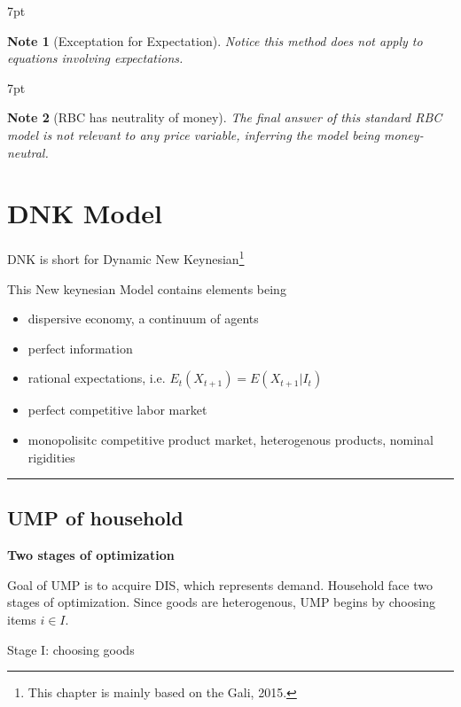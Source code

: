 \documentclass{article}
\providecommand{\tightlist}{
  \setlength{\itemsep}{0pt}
  \setlength{\parskip}{0pt}}
\newcommand*\sepline{%
  \begin{center}
    \rule[1ex]{.5\textwidth}{.5pt}
  \end{center}}
\newenvironment{blueblock}{
\def\FrameCommand{
  \hspace{1pt}
    {\color{DarkBlue}
    \vrule width 2pt}
    {\color{blueshade}
    \vrule width 4pt}
  \colorbox{blueshade}
}
\MakeFramed{
  \advance
  \hsize-
  \width
  \FrameRestore}
\noindent\hspace{-4.55pt}%
\begin{adjustwidth}{}{7pt}
\vspace{2pt}\vspace{2pt}
}
{\vspace{2pt}\end{adjustwidth}\endMakeFramed}
\newtheorem{note}{Note}
\begin{document}
\begin{blueblock}
\begin{note}[Exceptation for Expectation]
Notice this method does not apply to equations involving expectations.
\end{note}
\end{blueblock}

\begin{blueblock}
\begin{note}[RBC has neutrality of money]
The final answer of this standard RBC model is not relevant to any price variable, inferring the model being money-neutral.
\end{note}
\end{blueblock}









\newpage
\section{DNK Model}\label{dnk-model}

DNK is short for Dynamic New Keynesian\footnote{This chapter is mainly based on the Gali, 2015.}

This New keynesian Model contains elements being 
\begin{itemize}
\tightlist
  \item dispersive economy, a continuum of agents
  \item perfect information 
  \item rational expectations, i.e. $E_t(X_{t+1})=E(X_{t+1}|I_t)$
  \item perfect competitive labor market 
  \item monopolisitc competitive product market, heterogenous products, nominal rigidities
\end{itemize}



\sepline
\subsection{UMP of household} 

\textbf{Two stages of optimization}

Goal of UMP is to acquire DIS, which represents demand. Household face two stages of optimization. Since goods are heterogenous, UMP begins by choosing items $i\in I$.

Stage I: choosing goods
\end{document}
